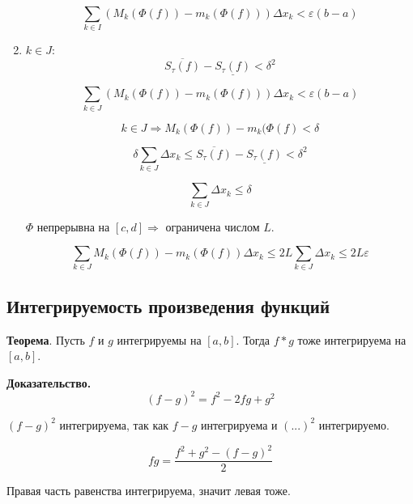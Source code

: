 \documentclass[a4paper]{article}
\begin{document}
\begin{definit}
\begin{hproof}
\begin{enumerate}
\[
\sum_{k \in I} \left( M_k(\Phi(f)) - m_k(\Phi(f)) \right) \Delta x_k < \varepsilon (b-a)
\]
\item $k \in J$:
\[
\overline{S_\tau(f)} - \underline{S_\tau(f)} < \delta^2
\]

\[
\sum_{k \in J} \left( M_k(\Phi(f)) - m_k(\Phi(f)) \right) \Delta x_k < \varepsilon (b-a)
\]


\[
k \in J \Rightarrow M_k(\Phi(f)) - m_k(\Phi(f) < \delta
\]

\[
 \delta \sum_{k \in J} \Delta x_k \leq \overline{S_\tau(f)} - \underline{S_\tau(f)} < \delta^2
\]

\[
\sum_{k \in J} \Delta x_k \leq \delta
\]

$\Phi$ непрерывна на $[c,d] \Rightarrow$ ограничена числом $L$.

\[
\sum_{k \in J} M_k(\Phi(f)) - m_k(\Phi(f)) \Delta x_k \leq 2L \sum_{k \in J} \Delta x_k  \leq 2L\varepsilon
\]

\end{enumerate}
\end{hproof}


\end{definit}

\begin{definit}
\hypertarget{p11}{}
\subsection*{Интегрируемость произведения функций}

\begin{htheorem}\textbf{Теорема}.
Пусть $f$ и $g$ интегрируемы на $[a,b]$. Тогда $f*g$ тоже интегрируема на $[a,b]$.

\end{htheorem}


\begin{hproof}\textbf{Доказательство.}
\[
(f-g)^2 = f^2 - 2fg + g^2
\]

$(f-g)^2$ интегрируема, так как $f-g$ интегрируема и $(...)^2$ интегрируемо.

\[
fg = \frac{f^2 + g^2 - (f-g)^2}{2}
\]

Правая часть равенства интегрируема, значит левая тоже.
\end{hproof}
\end{definit}
\end{document}
